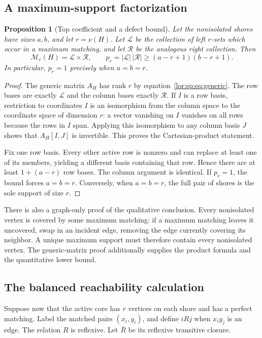 \documentclass[11pt]{article}
\numberwithin{equation}{section}
\newtheorem{proposition}[theorem]{Proposition}
\theoremstyle{definition}
\newcommand{\PM}{\mathcal M}
\begin{document}
\subsection{A maximum-support factorization}
\begin{proposition}[Top coefficient and a defect bound]
\label{lor:sp:prop:top}
Let the nonisolated shores have sizes $a,b$, and let $r=\nu(H)$. Let
$\mathcal L$ be the collection of left $r$-sets which occur in a maximum
matching, and let $\mathcal R$ be the analogous right collection. Then
\begin{equation}
 \PM_r(H)=\mathcal L\times\mathcal R,
 \qquad
 p_r=|\mathcal L|\,|\mathcal R|
 \ge(a-r+1)(b-r+1).
 \label{lor:sp:eq:topfactor}
\end{equation}
In particular, $p_r=1$ precisely when $a=b=r$.
\end{proposition}
\begin{proof}
The generic matrix $A_H$ has rank $r$ by equation~\eqref{lor:sp:eq:generic}. The row bases are
exactly $\mathcal L$ and the column bases exactly $\mathcal R$. If $I$ is a
row basis, restriction to coordinates $I$ is an isomorphism from the column
space to the coordinate space of dimension $r$: a vector vanishing on $I$
vanishes on all rows because the rows in $I$ span. Applying this isomorphism
to any column basis $J$ shows that $A_H[I,J]$ is invertible. This proves the
Cartesian-product statement.

Fix one row basis. Every other active row is nonzero and can replace at least
one of its members, yielding a different basis containing that row. Hence
there are at least $1+(a-r)$ row bases. The column argument is identical.
If $p_r=1$, the bound forces $a=b=r$. Conversely, when $a=b=r$, the full
pair of shores is the sole support of size $r$.
\end{proof}

There is also a graph-only proof of the qualitative conclusion. Every
nonisolated vertex is covered by some maximum matching: if a maximum matching
leaves it uncovered, swap in an incident edge, removing the edge currently
covering its neighbor. A unique maximum support must therefore contain every
nonisolated vertex. The generic-matrix proof additionally supplies the product
formula and the quantitative lower bound.

\subsection{The balanced reachability calculation}
Suppose now that the active core has $r$ vertices on each shore and has a
perfect matching. Label the matched pairs $(x_i,y_i)$, and define
$iRj$ when $x_i y_j$ is an edge. The relation $R$ is reflexive. Let $\overline R$
be its reflexive transitive closure.
\end{document}
